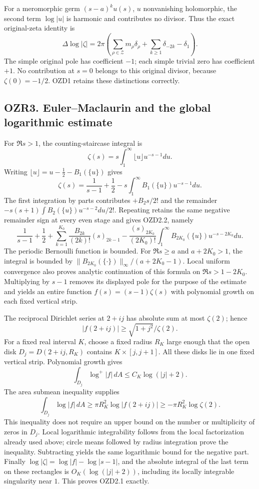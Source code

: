 For a meromorphic germ \((s-a)^ku(s)\), \(u\) nonvanishing holomorphic,
the second term \(\log|u|\) is harmonic and contributes no divisor. Thus
the exact original-zeta identity is \[
\Delta\log|\zeta|
=2\pi\left(\sum_{\rho\in\mathscr Z}m_\rho\delta_\rho
+\sum_{k\ge1}\delta_{-2k}-\delta_1\right).
\tag{OZR2.2}
\] The simple original pole has coefficient \(-1\); each simple trivial
zero has coefficient \(+1\). No contribution at \(s=0\) belongs to this
original divisor, because \(\zeta(0)=-1/2\). OZD1 retains these
distinctions correctly.

\subsection{OZR3. Euler--Maclaurin and the global logarithmic
estimate}\label{ozr3.-eulermaclaurin-and-the-global-logarithmic-estimate}

For \(\Re s>1\), the counting-staircase integral is \[
\zeta(s)=s\int_1^\infty\lfloor u\rfloor u^{-s-1}du.
\] Writing \(\lfloor u\rfloor=u-\tfrac12-B_1(\{u\})\) gives \[
\zeta(s)=\frac1{s-1}+\frac12-s\int_1^\infty B_1(\{u\})u^{-s-1}du.
\] The first integration by parts contributes \(+B_2s/2!\) and the
remainder \(-s(s+1)\int B_2(\{u\})u^{-s-2}du/2!\). Repeating retains the
same negative remainder sign at every even stage and gives OZD2.2,
namely \[
\frac1{s-1}+\frac12+
\sum_{k=1}^{K_0}\frac{B_{2k}}{(2k)!}(s)_{2k-1}
-\frac{(s)_{2K_0}}{(2K_0)!}\int_1^\infty B_{2K_0}(\{u\})u^{-s-2K_0}du.
\tag{OZR3.1}
\] The periodic Bernoulli function is bounded. For \(\Re s\ge a\) and
\(a+2K_0>1\), the integral is bounded by
\(\|B_{2K_0}(\{\cdot\})\|_\infty/(a+2K_0-1)\). Local uniform convergence
also proves analytic continuation of this formula on \(\Re s>1-2K_0\).
Multiplying by \(s-1\) removes its displayed pole for the purpose of the
estimate and yields an entire function \(f(s)=(s-1)\zeta(s)\) with
polynomial growth on each fixed vertical strip.

The reciprocal Dirichlet series at \(2+ij\) has absolute sum at most
\(\zeta(2)\); hence \[
|f(2+ij)|\ge\sqrt{1+j^2}/\zeta(2).
\tag{OZR3.2}
\] For a fixed real interval \(K\), choose a fixed radius \(R_K\) large
enough that the open disk \(D_j=D(2+ij,R_K)\) contains
\(K\times[j,j+1]\). All these disks lie in one fixed vertical strip.
Polynomial growth gives \[
\int_{D_j}\log^+|f|\,dA\le C_K\log(|j|+2).
\] The area submean inequality supplies \[
\int_{D_j}\log|f|\,dA
\ge\pi R_K^2\log|f(2+ij)|\ge-\pi R_K^2\log\zeta(2).
\] This inequality does not require an upper bound on the number or
multiplicity of zeros in \(D_j\). Local logarithmic integrability
follows from the local factorization already used above; circle means
followed by radius integration prove the inequality. Subtracting yields
the same logarithmic bound for the negative part. Finally
\(\log|\zeta|=\log|f|-\log|s-1|\), and the absolute integral of the last
term on these rectangles is \(O_K(\log(|j|+2))\), including its locally
integrable singularity near \(1\). This proves OZD2.1 exactly.

